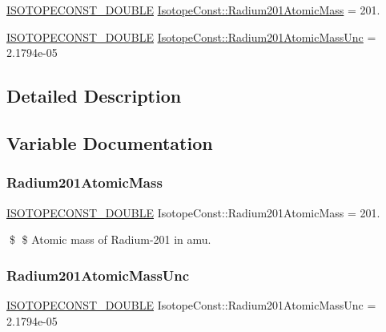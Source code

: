 \begin{DoxyCompactItemize}
\item 
\mbox{\hyperlink{group___isotope_const-_macros_ga8f45a7272ce02c0b4c65c44636ed719a}{I\+S\+O\+T\+O\+P\+E\+C\+O\+N\+S\+T\+\_\+\+D\+O\+U\+B\+LE}} \mbox{\hyperlink{group___isotope_const-_radium-_ra201_gab52556e1af37913398c26f62e31962a9}{Isotope\+Const\+::\+Radium201\+Atomic\+Mass}} = 201.
\item 
\mbox{\hyperlink{group___isotope_const-_macros_ga8f45a7272ce02c0b4c65c44636ed719a}{I\+S\+O\+T\+O\+P\+E\+C\+O\+N\+S\+T\+\_\+\+D\+O\+U\+B\+LE}} \mbox{\hyperlink{group___isotope_const-_radium-_ra201_ga52566900bc0b279c9d28ab8698f57d1c}{Isotope\+Const\+::\+Radium201\+Atomic\+Mass\+Unc}} = 2.\+1794e-\/05
\end{DoxyCompactItemize}


\subsection{Detailed Description}


\subsection{Variable Documentation}
\mbox{\label{group___isotope_const-_radium-_ra201_gab52556e1af37913398c26f62e31962a9}} 
\subsubsection{\texorpdfstring{Radium201\+Atomic\+Mass}{Radium201AtomicMass}}
{\footnotesize\ttfamily \mbox{\hyperlink{group___isotope_const-_macros_ga8f45a7272ce02c0b4c65c44636ed719a}{I\+S\+O\+T\+O\+P\+E\+C\+O\+N\+S\+T\+\_\+\+D\+O\+U\+B\+LE}} Isotope\+Const\+::\+Radium201\+Atomic\+Mass = 201.}

\$ \$ Atomic mass of Radium-\/201 in amu. \mbox{\label{group___isotope_const-_radium-_ra201_ga52566900bc0b279c9d28ab8698f57d1c}} 
\subsubsection{\texorpdfstring{Radium201\+Atomic\+Mass\+Unc}{Radium201AtomicMassUnc}}
{\footnotesize\ttfamily \mbox{\hyperlink{group___isotope_const-_macros_ga8f45a7272ce02c0b4c65c44636ed719a}{I\+S\+O\+T\+O\+P\+E\+C\+O\+N\+S\+T\+\_\+\+D\+O\+U\+B\+LE}} Isotope\+Const\+::\+Radium201\+Atomic\+Mass\+Unc = 2.\+1794e-\/05}

